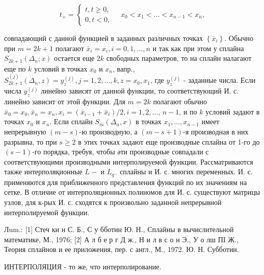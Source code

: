 \documentclass[10pt]{article}
\begin{document}
\[

t_{+}=\left\{\begin{array}{l}

t, t \geqslant 0, \\

0, t<0,

\end{array} \quad x_{0}<x_{1}<\ldots<x_{n-1}<x_{n},\right.

\]



совпадающий с данной функцией в заданных различных точках $\left\{\bar{x}_{i}\right\}$. Обычно при $m=2 k+1$ полагают $\bar{x}_{i}=x_{i}, i=0,1, \ldots, n$ и так как при этом у сплайна $S_{2 k+1}\left(\Delta_{n} ; x\right)$ остается еще $2 k$ свободных параметров, то на сплайн налагают еще по $k$ условий в точках $x_{0}$ и $x_{n}$, вапр., $S_{2 k+1}^{(j)}\left(\Delta_{n}, z\right)=y_{z}^{(j)}, j=1,2, \ldots, k, z=x_{0}, x_{1}$, где $y_{z}^{(j)}$ - заданные числа. Если числа $y_{z}^{(j)}$ линейно зависят от данной функции, то соответствующий И. с. линейно зависит от этой функции. Для $m=2 k$ полагают обычно $\bar{x}_{0}=x_{0}, \bar{x}_{n}=x_{n}, x_{i}=\left(\bar{x}_{i-1}+\bar{x}_{i}\right) / 2, i=1,2, \ldots$, $n-1$, и по $k$ условий задают в точках $x_{0}$ и $x_{n}$. Если сплайн $S_{m}\left(\Delta_{n}, x\right)$ в точках $x_{1}, \ldots, x_{n-1}$ имеет непрерывную $(m-s)$-ю производную, а $(m-s+1)$-я производная в них разрывна, то при $s \geqslant 2$ в этих точках задают еще производные сплайна от 1-го до $(s-1)$-го порядка, требуя, чтобы әти производные совпадали с соответствующими производными интерполируемой функции. Рассматриваются также интерполяқионные $L-$ и $L_{q^{-}}$ сплайны и И. с. многих переменных. И. с. применяются для приближенного представления функций по их значениям на сетке. В отличие от интерполяционных полиномов для И. с. существуют матрицы узлов, для к-рых И. с. сходятся к произвольно заданной непрерывной интерполируемой функции.



Лum.: [1] Стеч ки н С. Б., С у бботин Ю. Н., Сплайны в вычислительной математике, М., 1976; [2] А л б е р г Д ж., Н и л в с о н Э., У о лш ПI Ж., Теория сплайнов и ее приложения, пер. с англ., М., 1972. Ю. Н. Субботин.



ИНТЕРПОЛЯЦИЯ - то же, что интерполирование.
\end{document}

